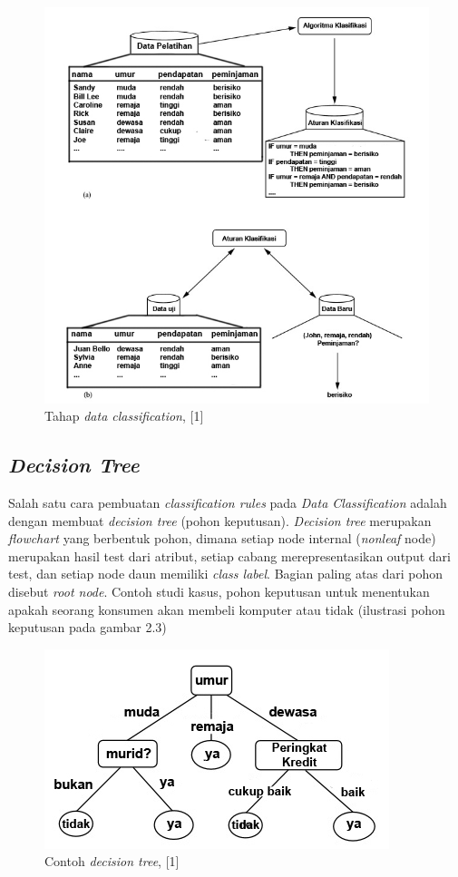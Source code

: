 \begin{figure}
\includegraphics[scale=1]{Gambar/tahapdataclassification.jpg}
\caption[Tahap \textsl{data classification}, [1]{Tahap \textsl{data classification}, [1]} 
\end{figure}

\subsection{\textsl{Decision Tree}}
Salah satu cara pembuatan \textsl{classification rules} pada \textsl{Data Classification} adalah dengan membuat \textsl{decision tree} (pohon keputusan). \textsl{Decision tree} merupakan \textsl{flowchart} yang berbentuk pohon, dimana setiap node internal (\textsl{nonleaf} node) merupakan hasil test dari atribut, setiap cabang merepresentasikan output dari test, dan setiap node daun memiliki \textsl{class label}. Bagian paling atas dari pohon disebut \textsl{root node}. Contoh studi kasus, pohon keputusan untuk menentukan apakah seorang konsumen akan membeli komputer atau tidak (ilustrasi pohon keputusan pada gambar 2.3) 

\begin{figure}
\includegraphics[scale=1]{Gambar/decisiontree.jpg}
\caption[Contoh \textsl{decision tree}, [1]{Contoh \textsl{decision tree}, [1]} 
\end{figure}

